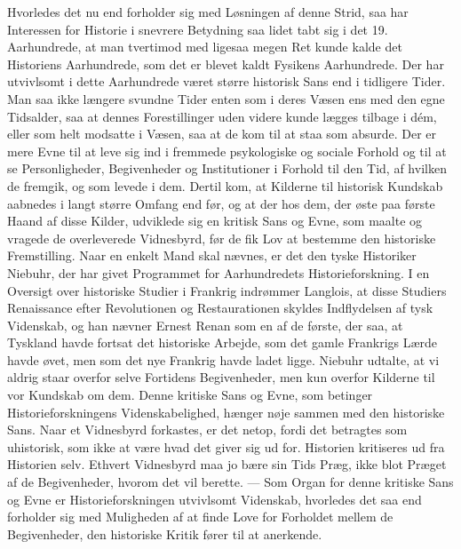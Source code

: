 \documentclass[12pt,a4paper,openany]{book}
\newcommand{\opage}[1]{\marginnote{\footnotesize\textit{[#1]}}}
\begin{document}
Hvorledes det nu end forholder sig med Løsningen af denne Strid,
saa har Interessen for Historie i snevrere Betydning saa lidet tabt
sig i det 19. Aarhundrede, at man tvertimod med ligesaa megen Ret
kunde kalde det Historiens Aarhundrede, som det er blevet kaldt
Fysikens Aarhundrede. Der har utvivlsomt i dette Aarhundrede været
større historisk Sans end i tidligere Tider. Man saa ikke længere
svundne Tider enten som i deres Væsen ens med den egne Tidsalder,
saa at dennes Forestillinger uden videre kunde lægges tilbage
i dém, eller som helt modsatte i Væsen, saa at de kom til at staa
som absurde. Der er mere Evne til at leve sig ind i fremmede psykologiske
og sociale Forhold og til at se Personligheder, Begivenheder
og Institutioner i Forhold til den Tid, af hvilken de fremgik, og som
levede i dem. Dertil kom, at Kilderne til historisk Kundskab aabnedes
i langt større Omfang end før, og at der hos dem, der øste paa
første Haand af disse Kilder, udviklede sig en kritisk Sans og Evne,
som maalte og vragede de overleverede Vidnesbyrd, før de fik Lov
at bestemme den historiske Fremstilling. Naar en enkelt Mand skal
nævnes, er det den tyske Historiker Niebuhr, der har givet Programmet
for Aarhundredets Historieforskning. I en Oversigt over historiske
Studier i Frankrig indrømmer Langlois, at disse Studiers Renaissance
efter Revolutionen og Restaurationen skyldes Indflydelsen
af tysk Videnskab, og han nævner Ernest Renan som en af de første,
der saa, at Tyskland havde fortsat det historiske Arbejde, som det
gamle Frankrigs Lærde havde øvet, men som det nye Frankrig
havde ladet ligge. Niebuhr udtalte, at vi aldrig staar overfor selve
Fortidens Begivenheder, men kun overfor Kilderne til vor Kundskab
om dem. Denne kritiske Sans og Evne, som betinger Historieforskningens
Videnskabelighed, hænger nøje sammen med den historiske
Sans. Naar et Vidnesbyrd forkastes, er det netop, fordi det betragtes
som uhistorisk, som ikke at være hvad det giver sig ud for. Historien
kritiseres ud fra Historien selv. Ethvert Vidnesbyrd maa jo bære
sin Tids Præg, ikke blot Præget af de Begivenheder, hvorom det vil
berette. --- Som Organ for denne kritiske Sans og Evne er Historieforskningen
utvivlsomt Videnskab, hvorledes det saa end forholder
\opage{59}sig med Muligheden af at finde Love for Forholdet mellem de Begivenheder,
 den historiske Kritik fører til at anerkende.
\end{document}
